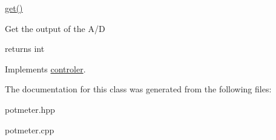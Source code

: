 \mbox{\hyperlink{classpotmeter_a9184480674fac846504a03a77036dd71}{get()}} 

Get the output of the A/D

returns int 

Implements \mbox{\hyperlink{classcontroler}{controler}}.



The documentation for this class was generated from the following files\+:\begin{DoxyCompactItemize}
\item 
potmeter.\+hpp\item 
potmeter.\+cpp\end{DoxyCompactItemize}
